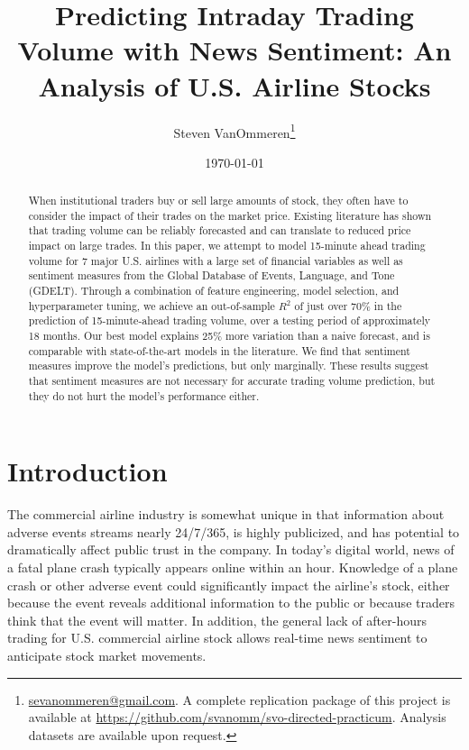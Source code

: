 \documentclass[12pt]{article}
\begin{document}
\title{Predicting Intraday Trading Volume with News Sentiment: An Analysis of U.S. Airline Stocks}
\author{Steven VanOmmeren\thanks{\href{mailto:sevanommeren@gmail.com}{sevanommeren@gmail.com}. A complete replication package of this project is available at \url{https://github.com/svanomm/svo-directed-practicum}. Analysis datasets are available upon request.}}
\date{\today}
\maketitle
\begin{abstract}
\noindent
    When institutional traders buy or sell large amounts of stock, they often have to consider the impact of their trades on the market price. Existing literature has shown that trading volume can be reliably forecasted and can translate to reduced price impact on large trades. In this paper, we attempt to model 15-minute ahead trading volume for 7 major U.S. airlines with a large set of financial variables as well as sentiment measures from the Global Database of Events, Language, and Tone (GDELT). Through a combination of feature engineering, model selection, and hyperparameter tuning, we achieve an out-of-sample $R^2$ of just over 70\% in the prediction of 15-minute-ahead trading volume, over a testing period of approximately 18 months. Our best model explains 25\% more variation than a naive forecast, and is comparable with state-of-the-art models in the literature. We find that sentiment measures improve the model's predictions, but only marginally. These results suggest that sentiment measures are not necessary for accurate trading volume prediction, but they do not hurt the model's performance either. 
\end{abstract}
\newpage
\tableofcontents
\newpage

\doublespacing
\section{Introduction}
The commercial airline industry is somewhat unique in that information about adverse events streams nearly 24/7/365, is highly publicized, and has potential to dramatically affect public trust in the company. In today's digital world, news of a fatal plane crash typically appears online within an hour. Knowledge of a plane crash or other adverse event could significantly impact the airline's stock, either because the event reveals additional information to the public or because traders think that the event will matter. In addition, the general lack of after-hours trading for U.S. commercial airline stock allows real-time news sentiment to anticipate stock market movements.
\end{document}
